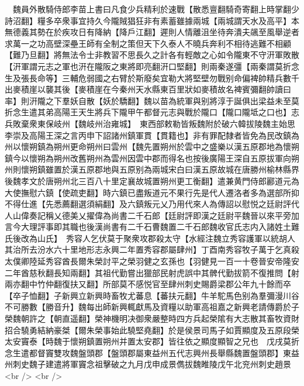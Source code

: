 　魏員外散騎侍郎李苗上書曰凡食少兵精利於速戰【散悉亶翻騎奇寄翻上時掌翻少詩沼翻】糧多卒衆事宜持久今隴賊猖狂非有素蓄雖據兩城【兩城謂天水及高平】本無德義其勢在於疾攻日有降納【降戶江翻】遲則人情離沮坐待奔潰夫飊至風舉逆者求萬一之功高壁深壘王師有全制之策但天下久泰人不曉兵奔利不相待逃難不相顧【難乃旦翻】將無法令士非教習不思長久之計各有輕敵之心如令隴東不守汧軍敗散【汧軍謂元志之軍也汧在隴阪之東將即亮翻汧口堅翻】則兩秦遂彊【兩秦謂莫折念生及張長命等】三輔危弱國之右臂於斯廢矣宜勒大將堅壁勿戰别命偏裨帥精兵數千出麥積崖以襲其後【麥積崖在今秦州天水縣東百里狀如麥積故名裨賓彌翻帥讀曰率】則汧隴之下羣妖自散【妖於驕翻】魏以苗為統軍與别將淳于誕俱出梁益未至莫折念生遣其弟高陽王天生將兵下隴甲午都督元志與戰於隴口【隴口隴坻之口也】志兵敗棄衆東保岐州【魏岐州治雍城】　東西部敕勒皆叛魏附於破六韓拔陵魏主始思李崇及高陽王深之言丙申下詔諸州鎮軍貫【貫籍也】非有罪配隸者皆免為民改鎮為州以懷朔鎮為朔州更命朔州曰雲州【魏先置朔州於雲中之盛樂以漢五原郡地為懷朔鎮今以懷朔為朔州改舊朔州為雲州因雲中郡而得名也按後廣陽王深自五原拔軍向朔州則懷朔鎮雖置於漢五原郡地與五原别為兩城宋白曰漢五原故城在唐勝州榆林縣界後魏孝文於唐朔州北三百八十里定襄故城置朔州更工衡翻】遣兼黄門侍郎酈道元為大使撫慰六鎮【使疏吏翻】時六鎮已盡叛道元不果行先是代人遷洛者多為選部所抑不得仕進【先悉薦翻選須絹翻】及六鎮叛元乂乃用代來人為傳詔以慰悦之廷尉評代人山偉奏記稱乂德美乂擢偉為尚書二千石郎【廷尉評即漢之廷尉平魏晉以來平旁加言今大理評事即其職也後漢尚書有二千石曹魏置二千石郎魏收官氏志内入諸姓土難氏後改為山氏】　秀容人乞伏莫于聚衆攻郡殺太守【水經注魏立秀容護軍以統胡人其治所去汾水六十里地形志永興二年置秀容郡屬肆州】丁酉南秀容牧子萬于乞真殺太僕卿陸延秀容酋長爾朱榮討平之榮羽健之玄孫也【羽健見一百一十卷晉安帝隆安二年酋慈秋翻長知兩翻】其祖代勤嘗出獵部民射虎誤中其髀代勤拔箭不復推問【射兩亦翻中竹仲翻復扶又翻】所部莫不感悦官至肆州刺史賜爵梁郡公年九十餘而卒【卒子恤翻】子新興立新興時畜牧尤蕃息【蕃扶元翻】牛羊駝馬色别為羣彌漫川谷不可勝數【勝音升】魏每出師新興輒獻馬及資糧以助軍高祖嘉之新興老請傳爵於子榮魏朝許之【朝直遥翻】榮神機明决御衆嚴整時四方兵起榮隂有大志散其畜牧資財招合驍勇結納豪桀【爾朱榮事始此驍堅堯翻】於是侯景司馬子如賈顯度及五原段榮太安竇泰【時魏于懷朔鎮置朔州并置太安郡】皆往依之顯度顯智之兄也　戊戌莫折念生遣都督竇雙攻魏盤頭郡【盤頭郡屬東益州五代志興州長舉縣魏置盤頭郡】東益州刺史魏子建遣將軍竇念祖擊破之九月戊申成景儁拔魏睢陵戊午北兖州刺史趙景<br />
<br />
